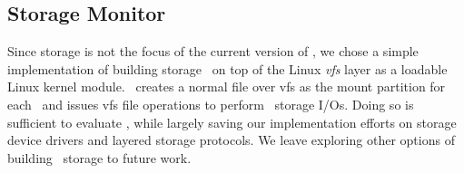 \documentclass[10pt,times,twocolumn]{z2-article}
\begin{document}
{{{{{{{\subsection{Storage Monitor}
Since storage is not the focus of the current version of \lego,
we chose a simple implementation of building storage \microos\ on top of the Linux {\em vfs} layer as a loadable Linux kernel module.
\lego\ creates a normal file over vfs as the mount partition for each \vnode\
and issues vfs file operations to perform \lego\ storage I/Os.
Doing so is sufficient to evaluate \lego, while largely saving our implementation efforts on storage device drivers and layered storage protocols.
We leave exploring other options of building \lego\ storage to future work.


}}}}}}}
\end{document}
